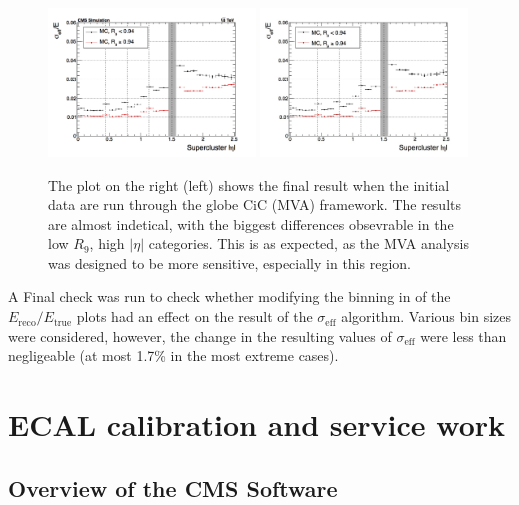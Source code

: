 \documentclass[10pt]{article}
\begin{document}
\begin{figure}[h!]

  \centering
\includegraphics[width=0.49\textwidth]{"EffSigma_vs_eta_mva"}
\includegraphics[width=0.49\textwidth]{"EffSigma_vs_eta_cic"}
\caption{The plot on the right (left) shows the final result when the initial data are run through the globe CiC (MVA) framework. The results are almost indetical, with the biggest differences obsevrable in the low $R_9$, high $|\eta|$ categories. This is as expected, as the MVA analysis was designed to be more sensitive, especially in this region.}
\end{figure}

A Final check was run to check whether modifying the binning in of the $E_{\text{reco}}/E_{\text{true}}$ plots had an effect on the result of the $\sigma_{\text{eff}}$ algorithm. Various bin sizes were considered, however, the change in the resulting values of $\sigma_{\text{eff}}$ were less than negligeable (at most 1.7\% in the most extreme cases).







\newpage

\section{ECAL calibration and service work}
\subsection{Overview of the CMS Software}
\end{document}
